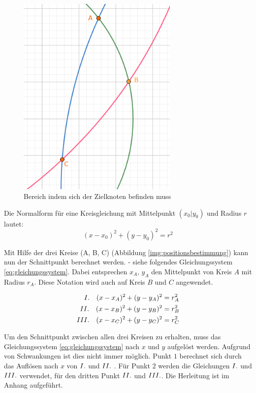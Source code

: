 \begin{figure}[H]
        \centering
        \includegraphics[width=0.7\textwidth]{images/positionsbestimmung_flaeche.png}
        \caption{Bereich indem sich der Zielknoten befinden muss}
        \label{img:schwankungen}
\end{figure}

Die Normalform für eine Kreisgleichung mit Mittelpunkt $(x_{0}|y_{0})$ und Radius $r$ lautet:
\begin{equation}
(x-x_{0})^{2}+(y-y_{0})^{2} = r^{2}
\end{equation}

Mit Hilfe der drei Kreise (A, B, C) (Abbildung \ref{img:positionsbestimmung}) kann nun der Schnittpunkt berechnet werden. - siehe folgendes Gleichungssystem \ref{eq:gleichungssystem}. Dabei entsprechen $x_{A}$, $y_{A}$ den Mittelpunkt von Kreis $A$ mit Radius $r_{A}$. Diese Notation wird auch auf Kreis $B$ und $C$ angewendet.

\begin{equation} \label{eq:gleichungssystem}
\begin{split}
\RM{1} \quad (x-x_{A})^{2}+(y-y_{A})^{2} &= r_{A}^{2} \\
\RM{2} \quad (x-x_{B})^{2}+(y-y_{B})^{2} &= r_{B}^{2} \\
\RM{3} \quad (x-x_{C})^{2}+(y-y_{C})^{2} &= r_{C}^{2}
\end{split}
\end{equation}

Um den Schnittpunkt zwischen allen drei Kreisen zu erhalten, muss das Gleichungssystem \ref{eq:gleichungssystem} nach $x$ und $y$ aufgelöst werden. Aufgrund von Schwankungen ist dies nicht immer möglich. Punkt $1$ berechnet sich durch das Auflösen nach $x$ von $\RM{1}$ und $\RM{2}$ . Für Punkt $2$ werden die Gleichungen $\RM{1}$ und $\RM{3}$ verwendet, für den dritten Punkt $\RM{2}$ und $\RM{3}$. Die Herleitung ist im Anhang aufgeführt. 

